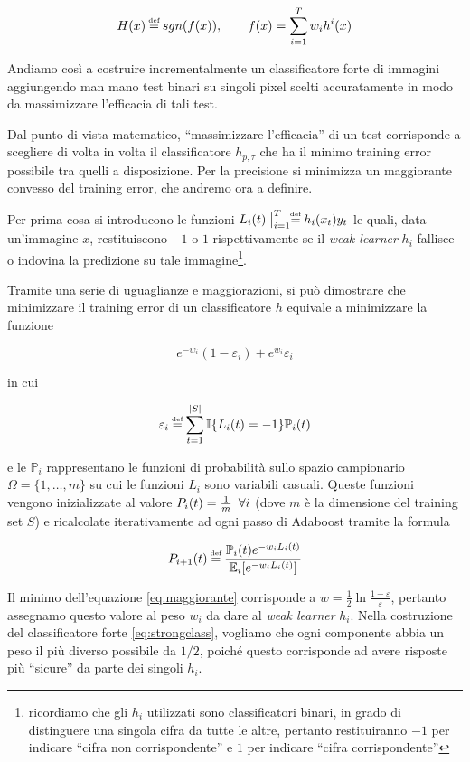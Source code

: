 \documentclass[12pt, letterpaper]{article}
\newcommand \eqdef{\mathrel{\stackrel{\makebox[0pt]{\mbox{\normalfont\tiny def}}}{=}}}
\begin{document}
\begin{equation} \label{eq:strongclass}
H(x) \eqdef sgn(f(x)), \hskip 2em f(x) = \sum\limits_{i=1}^T{w_i h^i(x)}
\end{equation}

Andiamo cos\`i a costruire incrementalmente un classificatore forte di immagini aggiungendo man mano test binari su singoli pixel scelti accuratamente in modo da massimizzare l'efficacia di tali test.

Dal punto di vista matematico, ``massimizzare l'efficacia'' di un test corrisponde a scegliere di volta in volta il classificatore \(h_{p,\tau}\) che ha il minimo training error possibile tra quelli a disposizione. Per la precisione si minimizza un maggiorante convesso del training error, che andremo ora a definire.

\hfill \break
Per prima cosa si introducono le funzioni \(L_i(t)\bigm|_{i=1}^T \eqdef h_i(x_t)y_t \) le quali, data un'immagine $x$, restituiscono $-1$ o $1$ rispettivamente se il {\it weak learner} $h_i$ fallisce o indovina la predizione su tale immagine\footnote{ricordiamo che gli $h_i$ utilizzati sono classificatori binari, in grado di distinguere una singola cifra da tutte le altre, pertanto restituiranno $-1$ per indicare ``cifra non corrispondente'' e $1$ per indicare ``cifra corrispondente''}.

Tramite una serie di uguaglianze e maggiorazioni, si pu\`o dimostrare che minimizzare il training error di un classificatore $h$ equivale a minimizzare la funzione

\begin{equation} \label{eq:maggiorante}
e^{-w_i}(1 - \varepsilon_i) + e^{w_i}\varepsilon_i 
\end{equation}

in cui

\[ \varepsilon_i \eqdef \sum\limits_{t=1}^{|S|}{\mathbb{I}\{L_i(t) = -1\}\mathbb{P}_i(t) } \]

e le $\mathbb{P}_i$ rappresentano le funzioni di probabilit\`a sullo spazio campionario \(\Omega = \{1, \dotsc, m\}\) su cui le funzioni $L_i$ sono variabili casuali. Queste funzioni vengono inizializzate al valore \(P_i(t) = \frac{1}{m} \hskip 0.5em \forall i \) (dove $m$ \`e la dimensione del training set $S$) e ricalcolate iterativamente ad ogni passo di Adaboost tramite la formula

\[ P_{i+1}(t) \eqdef \frac{\mathbb{P}_i(t)e^{-w_iL_i(t)}}{\mathbb{E}_i[e^{-w_iL_i(t)}]} \]

Il minimo dell'equazione \ref{eq:maggiorante} corrisponde a \(w = \frac{1}{2} \ln{\frac{1 - \varepsilon}{\varepsilon}}\), pertanto assegnamo questo valore al peso $w_i$ da dare al {\it weak learner} $h_i$.
Nella costruzione del classificatore forte \ref{eq:strongclass}, vogliamo che ogni componente abbia un peso il pi\`u  diverso possibile da $1/2$, poich\'e questo corrisponde ad avere risposte pi\`u ``sicure'' da parte dei singoli $h_i$.
\end{document}
